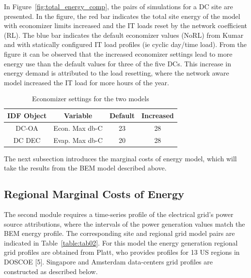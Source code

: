 In Figure~\ref{fig:total_energy_comp}, the pairs of simulations for a DC site are presented. In the figure, the red bar indicates the total site energy of the model with economizer limits increased and the IT loads reset by the network coefficient (RL). The blue bar indicates the default economizer values (NoRL) from Kumar and with statically configured IT load profiles (ie cyclic day/time load). From the figure it can be observed that the increased economizer settings lead to more energy use than the default values for three of the five DCs. This increase in energy demand is attributed to the load resetting, where the network aware model increased the IT load for more hours of the year. 

 \begin{center}
  \begin{table}[ht]
  \begin{center}
  \begin{small}
    \vspace{-10 pt}
    \caption{Economizer settings for the two models}
    \label{table:tab01}
    \centering
    \begin{tabular}{| c | c | c |c| }
      \hline
      IDF Object & Variable & Default & Increased\\
      \hline  \hline
      DC-OA & Econ. Max db-C & 23 & 28 \\
      \hline
      DC DEC & Evap. Max db-C & 20 & 28 \\
      \hline
    \end{tabular}
    \vspace{-8 pt}   %
    \end{small}
    \end{center} 
    \end{table}
  \end{center} 



The next subsection introduces the marginal costs of energy model, which will take the results from the BEM model described above.

\subsection{Regional Marginal Costs of Energy}
The second module requires a time-series profile of the electrical grid’s power source attributions, where the intervals of the power generation values match the BEM energy profile. The corresponding  site and regional grid model pairs are indicated in Table~\ref{table:tab02}. For this model the energy generation regional grid profiles are obtained from Platt, who provides profiles for 13 US regions in DOSCOE [5]. Singapore and Amsterdam data-centers grid profiles are constructed as described below.

